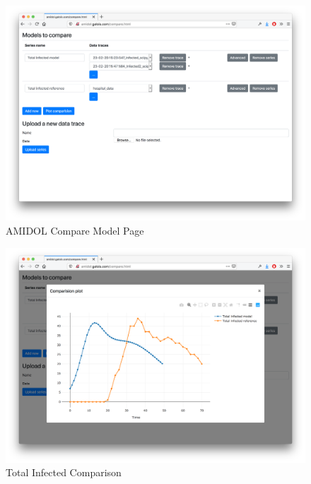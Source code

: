 \documentclass[12pt]{galois-whitepaper}
\begin{document}
\begin{figure}
  \centering
  \includegraphics[width=\textwidth]{figs/comparision-ui-3.png}
  \caption{AMIDOL Compare Model Page}
  \label{Fig:Comparison3}
\end{figure}

\begin{figure}
  \centering
  \includegraphics[width=\textwidth]{figs/comparision-ui-4.png}
  \caption{Total Infected Comparison}
  \label{Fig:Comparison4}
\end{figure}
\end{document}
